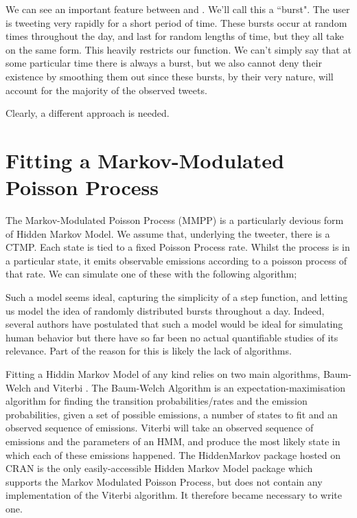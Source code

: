 We can see an important feature between 
and
. We'll call this a ``burst". The user is tweeting very rapidly for a short period of time. These bursts occur at random times throughout the day, and last for random lengths of time, but they all take on the same form. This heavily restricts our function. We can't simply say that at some particular time there is always a burst, but we also cannot deny their existence by smoothing them out since these bursts, by their very nature, will account for the majority of the observed tweets.

Clearly, a different approach is needed.

\section{Fitting a Markov-Modulated Poisson Process}

The Markov-Modulated Poisson Process (MMPP) is a particularly devious form of Hidden Markov Model. We assume that, underlying the tweeter, there is a CTMP. Each state is tied to a fixed Poisson Process rate. Whilst the process is in a particular state, it emits observable emissions according to a poisson process of that rate. We can simulate one of these with the following algorithm;


Such a model seems ideal, capturing the simplicity of a step function, and letting us model the idea of randomly distributed bursts throughout a day. Indeed, several authors have postulated that such a model would be ideal for simulating human behavior %
but there have so far been no actual quantifiable studies of its relevance. Part of the reason for this is likely the lack of algorithms.

Fitting a Hiddin Markov Model of any kind relies on two main algorithms, Baum-Welch %
and Viterbi
. The Baum-Welch Algorithm is an expectation-maximisation algorithm for finding the transition probabilities/rates and the emission probabilities, given a set of possible emissions, a number of states to fit and an observed sequence of emissions. Viterbi will take an observed sequence of emissions and the parameters of an HMM, and produce the most likely state in which each of these emissions happened. The HiddenMarkov package hosted on CRAN %
is the only easily-accessible Hidden Markov Model package which supports the Markov Modulated Poisson Process, but does not contain any implementation of the Viterbi algorithm. It therefore became necessary to write one.

